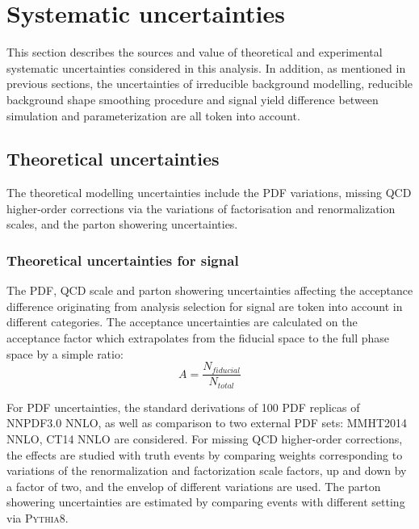 \section{Systematic uncertainties}

This section describes the sources and value of theoretical and experimental systematic uncertainties considered in this analysis.
In addition, as mentioned in previous sections, the uncertainties of irreducible background modelling, reducible background shape smoothing procedure and signal yield difference between simulation and parameterization are all token into account.

\subsection{Theoretical uncertainties}

The theoretical modelling uncertainties include the PDF variations, missing QCD higher-order corrections via the variations of factorisation and renormalization scales,
and the parton showering uncertainties.

\subsubsection{Theoretical uncertainties for signal}
\label{sec:hmhzz_theo_signal}

The PDF, QCD scale and parton showering uncertainties affecting the acceptance difference originating from analysis selection for signal are token into account in different categories.
The acceptance uncertainties are calculated on the acceptance factor which extrapolates from the fiducial space to the full phase space by a simple ratio:
\begin{equation}
        A = \frac{N_{fiducial}}{N_{total}}
\end{equation}

For PDF uncertainties, the standard derivations of 100 PDF replicas of NNPDF3.0 NNLO, as well as comparison to two external PDF sets: MMHT2014 NNLO, CT14 NNLO are considered.
For missing QCD higher-order corrections, the effects are studied with truth events by comparing weights corresponding to
variations of the renormalization and factorization scale factors, up and down by a factor of two, and the envelop of different variations are used.
The parton showering uncertainties are estimated by comparing events with different setting via \textsc{Pythia8}.

